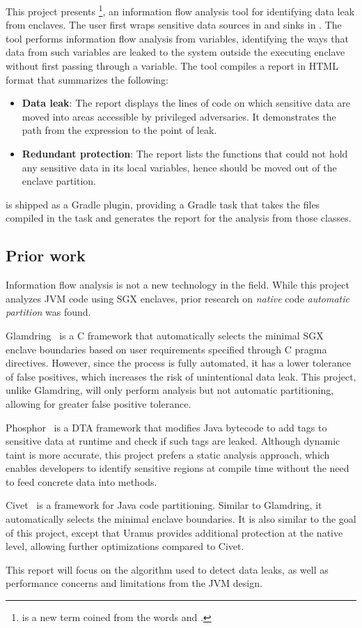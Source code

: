 This project presents \pname{}
\footnote{ is a new term coined from the words  and .},
an information flow analysis tool
for identifying data leak from enclaves.
The user first wraps sensitive data sources in  and sinks in .
The tool performs information flow analysis from  variables,
identifying the ways that data from such variables are leaked
to the system outside the executing enclave
without first passing through a  variable.
The tool compiles a report in HTML format that summarizes the following:
\begin{itemize}
	\item \textbf{Data leak}:
		The report displays the lines of code on which sensitive data are moved
		into areas accessible by privileged adversaries.
		It demonstrates the path from the  expression to the point of leak.
	\item \textbf{Redundant protection}:
		The report lists the functions that could not hold any sensitive data in its local variables,
		hence should be moved out of the enclave partition.
\end{itemize}

\pname{} is shipped as a Gradle plugin,
providing a Gradle task that
takes the  files compiled in the  task
and generates the report for the analysis from those classes.

\subsection{Prior work}\label{subsec:prior-art}
Information flow analysis is not a new technology in the field.
While this project analyzes \ac{JVM} code using \ac{SGX} enclaves,
prior research on \emph{native} code \emph{automatic partition} was found.

Glamdring~\cite{glamdring} is a C framework that
automatically selects the minimal \ac{SGX} enclave boundaries
based on user requirements specified through C pragma directives.
However, since the process is fully automated,
it has a lower tolerance of false positives,
which increases the risk of unintentional data leak.
This project, unlike Glamdring, will only perform analysis but not automatic partitioning,
allowing for greater false positive tolerance.

Phosphor~\cite{BellJonathan2014Pidd} is a \ac{DTA} framework
that modifies Java bytecode to add tags to sensitive data at runtime
and check if such tags are leaked.
Although dynamic taint is more accurate,
this project prefers a static analysis approach,
which enables developers to identify sensitive regions at compile time
without the need to feed concrete data into methods.

Civet~\cite{civet} is a framework for Java code partitioning.
Similar to Glamdring, it automatically selects the minimal enclave boundaries.
It is also similar to the goal of this project,
except that Uranus provides additional protection at the native level,
allowing further optimizations compared to Civet.

This report will focus on the algorithm used to detect data leaks,
as well as performance concerns and limitations from the \ac{JVM} design.
